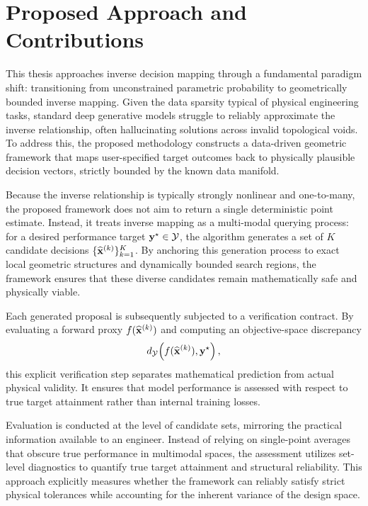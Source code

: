 \section{Proposed Approach and Contributions}

This thesis approaches inverse decision mapping through a fundamental paradigm shift: transitioning from unconstrained parametric probability to geometrically bounded inverse mapping. Given the data sparsity typical of physical engineering tasks, standard deep generative models struggle to reliably approximate the inverse relationship, often hallucinating solutions across invalid topological voids. To address this, the proposed methodology constructs a data-driven geometric framework that maps user-specified target outcomes back to physically plausible decision vectors, strictly bounded by the known data manifold.

Because the inverse relationship is typically strongly nonlinear and one-to-many, the proposed framework does not aim to return a single deterministic point estimate. Instead, it treats inverse mapping as a multi-modal querying process: for a desired performance target $\mathbf{y}^{\star}\in\mathcal{Y}$, the algorithm generates a set of $K$ candidate decisions $\{\widehat{\mathbf{x}}^{(k)}\}_{k=1}^K$. By anchoring this generation process to exact local geometric structures and dynamically bounded search regions, the framework ensures that these diverse candidates remain mathematically safe and physically viable.

Each generated proposal is subsequently subjected to a verification contract. By evaluating a forward proxy $f(\widehat{\mathbf{x}}^{(k)})$ and computing an objective-space discrepancy
\[
d_{\mathcal{Y}}\!\left(f(\widehat{\mathbf{x}}^{(k)}), \mathbf{y}^{\star}\right),
\]
this explicit verification step separates mathematical prediction from actual physical validity. It ensures that model performance is assessed with respect to true target attainment rather than internal training losses.

Evaluation is conducted at the level of candidate sets, mirroring the practical information available to an engineer. Instead of relying on single-point averages that obscure true performance in multimodal spaces, the assessment utilizes set-level diagnostics to quantify true target attainment and structural reliability. This approach explicitly measures whether the framework can reliably satisfy strict physical tolerances while accounting for the inherent variance of the design space.

